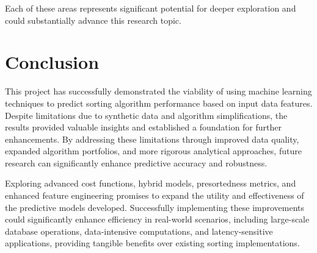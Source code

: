 \documentclass[twocolumn]{article}
\begin{document}
Each of these areas represents significant potential for deeper exploration and could substantially advance this research topic.

\section{Conclusion}
This project has successfully demonstrated the viability of using machine learning techniques to predict sorting algorithm performance based on input data features. Despite limitations due to synthetic data and algorithm simplifications, the results provided valuable insights and established a foundation for further enhancements. By addressing these limitations through improved data quality, expanded algorithm portfolios, and more rigorous analytical approaches, future research can significantly enhance predictive accuracy and robustness. 

Exploring advanced cost functions, hybrid models, presortedness metrics, and enhanced feature engineering promises to expand the utility and effectiveness of the predictive models developed. Successfully implementing these improvements could significantly enhance efficiency in real-world scenarios, including large-scale database operations, data-intensive computations, and latency-sensitive applications, providing tangible benefits over existing sorting implementations.



\end{document}
